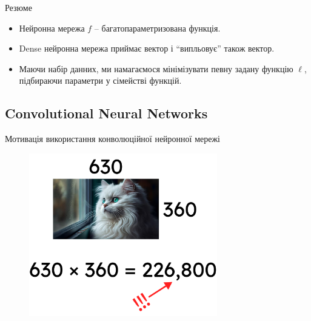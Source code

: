 \documentclass[xcolor={usenames,dvipsnames}]{beamer}
\begin{document}
    \begin{frame}{Резюме}
        \begin{itemize}
            \item Нейронна мережа $f$ -- багатопараметризована функція.
            \item Dense нейронна мережа приймає вектор і ``випльовує'' також вектор.
            \item Маючи набір данних, ми намагаємося мінімізувати певну задану функцію $\ell$, підбираючи параметри у сімействі функцій.
        \end{itemize}    
	\end{frame}

    \subsection{Convolutional Neural Networks}
	\begin{frame}{Мотивація використання конволюційної нейронної мережі}
	    \begin{figure}
        \centering
            \includegraphics[width=0.73\textwidth]{images/cnn_motivation.png}
        \end{figure}
	\end{frame}
\end{document}
